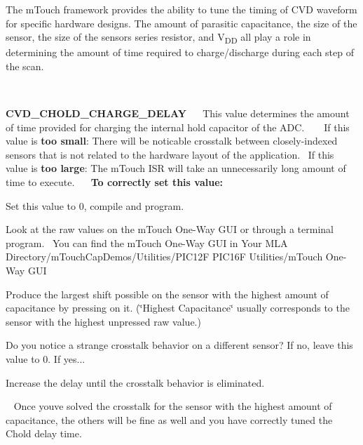 The m\+Touch framework provides the ability to tune the timing of C\+V\+D waveform for specific hardware designs. The amount of parasitic capacitance, the size of the sensor, the size of the sensor\textquotesingle{}s series resistor, and V\textsubscript{D\+D} all play a role in determining the amount of time required to charge/discharge during each step of the scan.

 ~\newline


\begin{DoxyItemize}
\item {\bfseries C\+V\+D\+\_\+\+C\+H\+O\+L\+D\+\_\+\+C\+H\+A\+R\+G\+E\+\_\+\+D\+E\+L\+A\+Y}~\newline
~\newline
 This value determines the amount of time provided for charging the internal hold capacitor of the A\+D\+C. ~\newline
~\newline
 If this value is {\bfseries too small}\+: There will be noticable crosstalk between closely-\/indexed sensors that is not related to the hardware layout of the application.~\newline
 If this value is {\bfseries too large}\+: The m\+Touch I\+S\+R will take an unnecessarily long amount of time to execute.~\newline
~\newline
 {\bfseries To correctly set this value\+:} 
\begin{DoxyEnumerate}
\item Set this value to 0, compile and program. 
\item Look at the raw values on the m\+Touch One-\/\+Way G\+U\+I or through a terminal program.~\newline
 You can find the m\+Touch One-\/\+Way G\+U\+I in {\ttfamily Your M\+L\+A Directory/m\+Touch\+Cap\+Demos/\+Utilities/\+P\+I\+C12\+F P\+I\+C16\+F Utilities/m\+Touch One-\/\+Way G\+U\+I} 
\item Produce the largest shift possible on the sensor with the highest amount of capacitance by pressing on it. (\char`\"{}\+Highest Capacitance\char`\"{} usually corresponds to the sensor with the highest unpressed raw value.) 
\begin{DoxyItemize}
\item Do you notice a strange crosstalk behavior on a different sensor? If no, leave this value to 0. If yes... 
\end{DoxyItemize}
\item Increase the delay until the crosstalk behavior is eliminated. 
\end{DoxyEnumerate}~\newline
 Once you\textquotesingle{}ve solved the crosstalk for the sensor with the highest amount of capacitance, the others will be fine as well and you have correctly tuned the Chold delay time.\end{DoxyItemize}
~\newline


